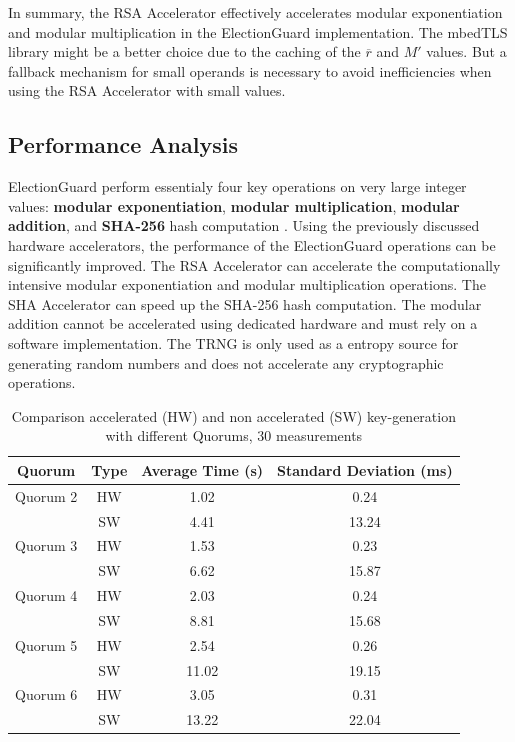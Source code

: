 In summary, the \ac{RSA} Accelerator effectively accelerates modular exponentiation and modular multiplication in the ElectionGuard implementation. The mbedTLS library might be a better choice due to the caching of the \( \overline{r} \) and \( M' \) values. But a fallback mechanism for small operands is necessary to avoid inefficiencies when using the \ac{RSA} Accelerator with small values. 

\subsection{Performance Analysis}
ElectionGuard perform essentialy four key operations on very large integer values: \textbf{modular exponentiation}, \textbf{modular multiplication}, \textbf{modular addition}, and \textbf{SHA-256} hash computation \cite[25]{eg-spec}. Using the previously discussed hardware accelerators, the performance of the ElectionGuard operations can be significantly improved. The \ac{RSA} Accelerator can accelerate the computationally intensive modular exponentiation and modular multiplication operations. The \ac{SHA} Accelerator can speed up the \ac{SHA}-256 hash computation. The modular addition cannot be accelerated using dedicated hardware and must rely on a software implementation. The \ac{TRNG} is only used as a entropy source for generating random numbers and does not accelerate any cryptographic operations.

\begin{table}[h!]
    \centering
    \begin{tabular}{|c|c|c|c|}
        \hline
        \textbf{Quorum} & \textbf{Type} & \textbf{Average Time (s)} & \textbf{Standard Deviation (ms)} \\
        \hline
        Quorum 2 & HW & 1.02 & 0.24 \\
        & SW & 4.41 & 13.24 \\
        \hline
        Quorum 3 & HW & 1.53 & 0.23 \\
        & SW & 6.62 & 15.87 \\
        \hline
        Quorum 4 & HW & 2.03 & 0.24 \\
        & SW & 8.81 & 15.68 \\
        \hline
        Quorum 5 & HW & 2.54 & 0.26 \\
        & SW & 11.02 & 19.15 \\
        \hline
        Quorum 6 & HW & 3.05 & 0.31 \\
        & SW & 13.22 & 22.04 \\
        \hline
    \end{tabular}
    \caption{Comparison accelerated (HW) and non accelerated (SW) key-generation with different Quorums, 30 measurements}
    \label{tab:perfromance-quorum}
\end{table}


